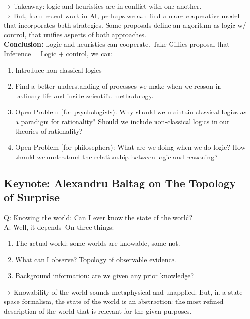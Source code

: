 $\rightarrow$ Takeaway: logic and heuristics are in conflict with one another. \\

$\rightarrow$ But, from recent work in AI, perhaps we can find a more cooperative model that incorporates both strategies. Some proposals define an algorithm as logic w/ control, that unifies aspects of both approaches. \\

{\bf Conclusion:} Logic and heuristics can cooperate. Take Gillies proposal that Inference = Logic + control, we can:
\begin{enumerate}
    \item Introduce non-classical logics
    \item Find a better understanding of processes we make when we reason in ordinary life and inside scientific methodology.
    \item Open Problem (for psychologists): Why should we maintain classical logics as a paradigm for rationality? Should we include non-classical logics in our theories of rationality?
    \item Open Problem (for philosophers): What are we doing when we do logic? How should we understand the relationship between logic and reasoning?
\end{enumerate}

\spacerule



\subsection{Keynote: Alexandru Baltag on The Topology of Surprise}

Q: Knowing the world: Can I ever know the state of the world? \\

A: Well, it depends! On three things:
\begin{enumerate}
    \item The actual world: some worlds are knowable, some not.
    \item What can I observe? Topology of observable evidence.
    \item Background information: are we given any prior knowledge?
\end{enumerate}

$\rightarrow$ Knowability of the world sounds metaphysical and unapplied. But, in a state-space formalism, the state of the world is an abstraction: the most refined description of the world that is relevant for the given purposes. \\

